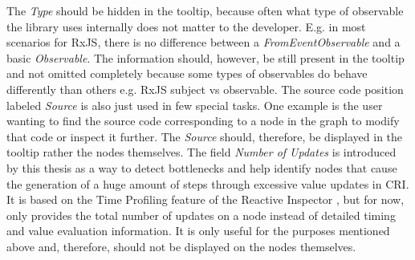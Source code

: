 The \emph{Type} should be hidden in the tooltip, because often what type of observable the library uses internally does not matter to the developer. E.g. in most scenarios for RxJS, there is no difference between a \emph{FromEventObservable} and a basic \emph{Observable}. The information should, however, be still present in the tooltip and not omitted completely because some types of observables do behave differently than others e.g. RxJS subject vs observable. The source code position labeled \emph{Source} is also just used in few special tasks. One example is the user wanting to find the source code corresponding to a node in the graph to modify that code or inspect it further. The \emph{Source} should, therefore, be displayed in the tooltip rather the nodes themselves. The field \emph{Number of Updates} is introduced by this thesis as a way to detect bottlenecks and help identify nodes that cause the generation of a huge amount of steps through excessive value updates in CRI. It is based on the Time Profiling feature of the Reactive Inspector \cite{ReactiveInspector}, but for now, only provides the total number of updates on a node instead of detailed timing and value evaluation information. It is only useful for the purposes mentioned above and, therefore, should not be displayed on the nodes themselves.


